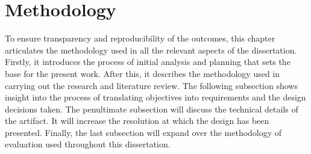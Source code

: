 




\chapter{Methodology}
\label{chap:methodology}

To ensure transparency and reproducibility of the outcomes, this chapter articulates the methodology used in all the relevant aspects of the dissertation. 
Firstly, it introduces the process of initial analysis and planning that sets the base for the present work. After this, it describes the methodology used in carrying out the research and literature review. The following subsection shows insight into the process of translating objectives into requirements and the design decisions taken. The penultimate subsection will discuss the technical details of the artifact. It will increase the resolution at which the design has been presented. Finally, the last subsection will expand over the methodology of evaluation used throughout this dissertation.

